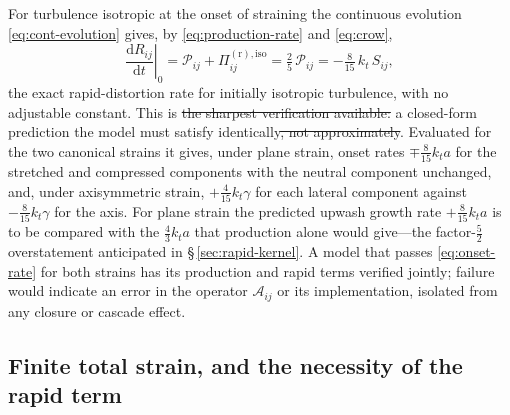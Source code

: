 \documentclass[lineno]{JFM-FLM_Au}
\providecommand{\DIFdel}[1]{{\protect\color{red}\sout{#1}}} %
\providecommand{\DIFdelbegin}{} %
\providecommand{\DIFdelend}{} %
\begin{document}
For turbulence isotropic at the onset of straining the continuous
evolution \eqref{eq:cont-evolution} gives, by
\eqref{eq:production-rate} and \eqref{eq:crow},
\begin{equation}
  \left.\frac{\mathrm{d}R_{ij}}{\mathrm{d}t}\right|_{0}
  = \mathcal{P}_{ij}+\Pi^{(\mathrm r),\mathrm{iso}}_{ij}
  = \tfrac{2}{5}\,\mathcal{P}_{ij}
  = -\tfrac{8}{15}\,k_t\,S_{ij},
  \label{eq:onset-rate}
\end{equation}
the exact rapid-distortion rate for initially isotropic turbulence, with
no adjustable constant. This is \DIFdelbegin \DIFdel{the sharpest verification available: }\DIFdelend a
closed-form prediction the model must satisfy identically\DIFdelbegin \DIFdel{, not
approximately}\DIFdelend . Evaluated for the two canonical strains it gives, under
plane strain, onset rates $\mp\tfrac{8}{15}k_ta$ for the stretched and
compressed components with the neutral component unchanged, and, under
axisymmetric strain, $+\tfrac{4}{15}k_t\gamma$ for each lateral
component against $-\tfrac{8}{15}k_t\gamma$ for the axis. For plane
strain the predicted upwash growth rate $+\tfrac{8}{15}k_ta$ is to be
compared with the $\tfrac43k_ta$ that production alone would give---the
factor-$\tfrac52$ overstatement anticipated in
\S\,\ref{sec:rapid-kernel}. A model that passes \eqref{eq:onset-rate}
for both strains has its production and rapid terms verified jointly;
failure would indicate an error in the operator $\mathcal{A}_{ij}$ or
its implementation, isolated from any closure or cascade effect.

\subsection{Finite total strain, and the necessity of the rapid term}
\label{sec:finite-strain}
\end{document}
